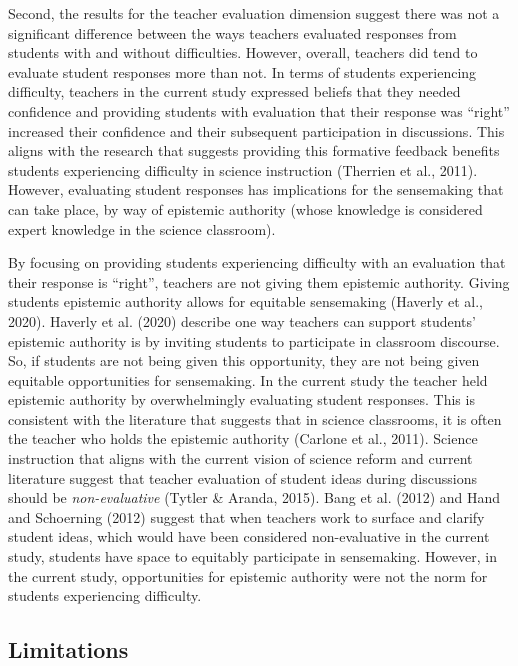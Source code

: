 \documentclass{sig-alternate} %
\begin{document}
\begin{large}
Second, the results for the teacher evaluation dimension suggest there was not a significant difference between the ways teachers evaluated responses from students with and without difficulties. However, overall, teachers did tend to evaluate student responses more than not. In terms of students experiencing difficulty, teachers in the current study expressed beliefs that they needed confidence and providing students with evaluation that their response was “right” increased their confidence and their subsequent participation in discussions. This aligns with the research that suggests providing this formative feedback benefits students experiencing difficulty in science instruction (Therrien et al., 2011). However, evaluating student responses has implications for the sensemaking that can take place, by way of epistemic authority (whose knowledge is considered expert knowledge in the science classroom).  

By focusing on providing students experiencing difficulty with an evaluation that their response is “right”, teachers are not giving them epistemic authority. Giving students epistemic authority allows for equitable sensemaking (Haverly et al., 2020). Haverly et al. (2020) describe one way teachers can support students’ epistemic authority is by inviting students to participate in classroom discourse. So, if students are not being given this opportunity, they are not being given equitable opportunities for sensemaking. In the current study the teacher held epistemic authority by overwhelmingly evaluating student responses. This is consistent with the literature that suggests that in science classrooms, it is often the teacher who holds the epistemic authority (Carlone et al., 2011). Science instruction that aligns with the current vision of science reform and current literature suggest that teacher evaluation of student ideas during discussions should be \textit{non-evaluative} (Tytler \& Aranda, 2015). Bang et al. (2012) and Hand and Schoerning (2012) suggest that when teachers work to surface and clarify student ideas, which would have been considered non-evaluative in the current study, students have space to equitably participate in sensemaking. However, in the current study, opportunities for epistemic authority were not the norm for students experiencing difficulty.

\subsection*{Limitations}


\end{large}
\end{document}
